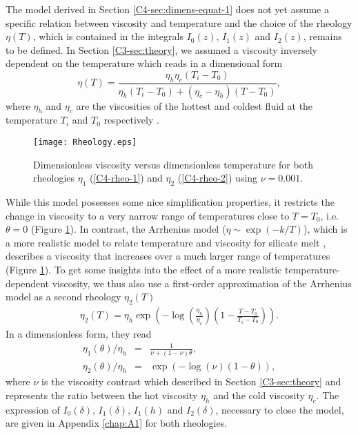 The model derived in  Section \ref{C4-sec:dimens-equat-1} does not yet
assume a specific  relation between viscosity and  temperature and the
choice of the rheology $\eta(T)$,  which is contained in the integrals
$I_0(z)$, $I_1(z)$  and $I_2(z)$, remains  to be defined.   In Section
\ref{C3-sec:theory}, we assumed a viscosity inversely dependent on the
temperature which reads in a dimensional form
\begin{equation}
  \eta(T)=\frac{\eta_h
    \eta_c(T_i-T_0)}{\eta_h(T_i-T_0)+(\eta_c-\eta_h)(T-T_0)},
\end{equation}
where $\eta_h$  and $\eta_c$  are the viscosities  of the  hottest and
coldest  fluid  at  the   temperature  $T_i$  and  $T_0$  respectively
\citep{Bercovici:2007vc}.
\begin{figure}[h!]
  \begin{center}
    \graphicspath{ {/Users/thorey/Documents/These/Projet/Refroidissement/Skin_Model/Figure/Figure_Heating/} }
    \texttt{[image: Rheology.eps]}
    \caption{Dimensionless viscosity  versus dimensionless temperature
      for  both  rheologies  $\eta_1$ (\ref{C4-rheo-1})  and  $\eta_2$
      (\ref{C4-rheo-2}) using $\nu=0.001$.}
    \label{C4-Rheology}
  \end{center}
\end{figure}
While  this model  possesses some  nice simplification  properties, it
restricts  the  change  in  viscosity   to  a  very  narrow  range  of
temperatures    close   to    $T=T_0$,   i.e.     $\theta=0$   (Figure
\ref{C4-Rheology}).     In     contrast,    the     Arrhenius    model
($\eta \sim  \exp(-k/T)$), which is  a more realistic model  to relate
temperature      and       viscosity      for       silicate      melt
\citep{Anonymous:CZVBrBvv,Blatt:2ViMWPc0,Crisp:1990gf,Costa:2003wk},
describes  a viscosity  that increases  over  a much  larger range  of
temperatures (Figure  \ref{C4-Rheology}).  To  get some  insights into
the  effect of  a more  realistic temperature-dependent  viscosity, we
thus also use a first-order approximation  of the Arrhenius model as a
second rheology $\eta_2(T)$ \citep{Diniega:2013eh}
\begin{eqnarray}
  \eta_2(T)                          =                          \eta_h
  \exp\left(-\log\left(\frac{\eta_h}{\eta_c}\right)\left(1-\frac{T-T_0}{T_i-T_0}\right)\right).
\end{eqnarray}
In a dimensionless form, they read
\begin{eqnarray}
  \eta_1(\theta)/\eta_h&=&\frac{1}{\nu+(1-\nu)\theta} ,\label{C4-rheo-1}\\
  \eta_2(\theta)/\eta_h&=&\exp\left(-\log(\nu)\left(1-\theta\right)\right),  \label{C4-rheo-2}
\end{eqnarray}
where  $\nu$ is  the  viscosity contrast  which  described in  Section
\ref{C3-sec:theory} and represents the ratio between the hot viscosity
$\eta_h$  and   the  cold  viscosity  $\eta_c$.    The  expression  of
$I_0(\delta)$, $I_1(\delta)$, $I_1(h)$ and $I_2(\delta)$, necessary to
close  the  model,  are  given  in  Appendix  \ref{chap:A1}  for  both
rheologies.

